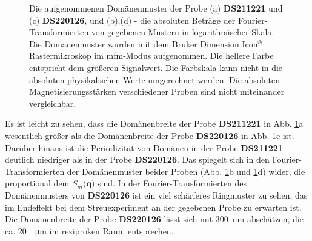\begin{figure}[H]
    \centering
    
    \caption{Die aufgenommenen Domänenmuster der Probe (a) \textbf{DS211221} und (c) \textbf{DS220126}, und (b),(d) - die absoluten Beträge der Fourier-Transformierten von gegebenen Mustern in logarithmischer Skala. Die Domänenmuster wurden mit dem Bruker Dimension Icon$^{\text{®}}$ Rastermikroskop im \gls{mfm}-Modus aufgenommen. Die hellere Farbe entspricht dem größeren Signalwert. Die Farbskala kann nicht in die absoluten physikalischen Werte umgerechnet werden. Die absoluten Magnetisierungsstärken verschiedener Proben sind nicht miteinander vergleichbar.}
    \label{fig:mfm-amplitude-ft}
\end{figure}
\noindent
Es ist leicht zu sehen, dass die Domänenbreite der Probe \textbf{DS211221} in Abb. \ref{fig:mfm-amplitude-ft}a wesentlich größer als die Domänenbreite der Probe \textbf{DS220126} in Abb. \ref{fig:mfm-amplitude-ft}c ist. Darüber hinaus ist die Periodizität von Domänen in der Probe \textbf{DS211221} deutlich niedriger als in der Probe  \textbf{DS220126}. Das spiegelt sich in den Fourier-Transformierten der Domänenmuster beider Proben (Abb. \ref{fig:mfm-amplitude-ft}b und \ref{fig:mfm-amplitude-ft}d) wider, die proportional dem $S_m(\mathbf{q)}$ sind. In der Fourier-Transformierten des Domänenmusters von \textbf{DS220126} ist ein viel schärferes Ringmuster zu sehen, das im Endeffekt bei dem Streuexperiment an der gegebenen Probe zu erwarten ist. Die Domänenbreite der Probe \textbf{DS220126} lässt sich mit \SI{300}{\nano\meter} abschätzen, die ca. \SI{20}{\per\micro\meter} im reziproken Raum entsprechen.

